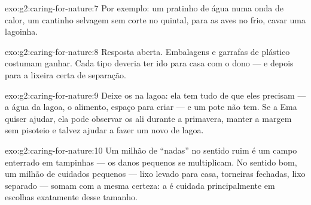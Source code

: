 \begin{solution}{exo:g2:caring-for-nature:7}
Por exemplo: um pratinho de água numa onda de calor, um cantinho
selvagem sem corte no quintal,  para as aves no frio, cavar
uma lagoinha.
\end{solution}

\begin{solution}{exo:g2:caring-for-nature:8}
Resposta aberta. Embalagens e garrafas de plástico costumam ganhar.
Cada tipo deveria ter ido para casa com o dono --- e depois para a
lixeira certa de separação.
\end{solution}

\begin{solution}{exo:g2:caring-for-nature:9}
Deixe os  na lagoa: ela tem tudo de que eles precisam --- a
água da lagoa, o alimento, espaço para criar  --- e um pote
não tem. Se a Ema quiser ajudar, ela pode observar os  ali
durante a primavera, manter a margem sem pisoteio e talvez ajudar a
fazer um novo  de lagoa.
\end{solution}

\begin{solution}{exo:g2:caring-for-nature:10}
Um milhão de ``nadas'' no sentido ruim é um campo enterrado em
tampinhas --- os danos pequenos se multiplicam. No sentido bom, um
milhão de cuidados pequenos --- lixo levado para casa, torneiras
fechadas, lixo separado --- somam com a mesma certeza: a  é
cuidada principalmente em escolhas exatamente desse tamanho.
\end{solution}
